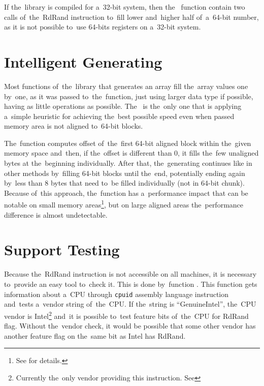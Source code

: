 \par{
If the~library is compiled for a~32-bit system, then the~ function contain two calls of~the~RdRand instruction to~fill lower and~higher half of~a~64-bit number, as it is not possible to~use 64-bits registers on a~32-bit system. 
}
\section{Intelligent Generating}
\par{
Most functions of~the~library that generates an array fill the~array values one by~one, as it was passed to~the~function, just using larger data type if possible, having as little operations as possible. The~ is the~only one that is applying a~simple heuristic for achieving the~best possible speed even when passed memory area is not aligned to~64-bit blocks.
}

\par{
The~function computes offset of~the~first 64-bit aligned block within the~given memory space and~then, if the~offset is different than 0, it fills the~few unaligned bytes at the~beginning individually. After that, the~generating continues like in other methods by~filling 64-bit blocks until the~end, potentially ending again by~less than 8 bytes that need to~be filled individually (not in 64-bit chunk). Because of~this approach, the~function has a~performance impact that can be notable on small memory areas\footnote{See  for details.}, but on large aligned areas the~performance difference is almost undetectable. 
}

\section{Support Testing}
\par{
Because the~RdRand instruction is not accessible on all machines, it is necessary to~provide an easy tool to~check it. This is done by~function . This function gets information about a~CPU through {\tt cpuid} assembly language instruction and~tests a~vendor string of~the~CPU. If the~string is ``GenuineIntel'', the~CPU vendor is Intel\footnote{Currently the~only vendor providing this instruction. See } and~it is possible to~test feature bits of~the~CPU for RdRand flag. Without the~vendor check, it would be possible that some other vendor has another feature flag on the~same bit as Intel has RdRand.
}

